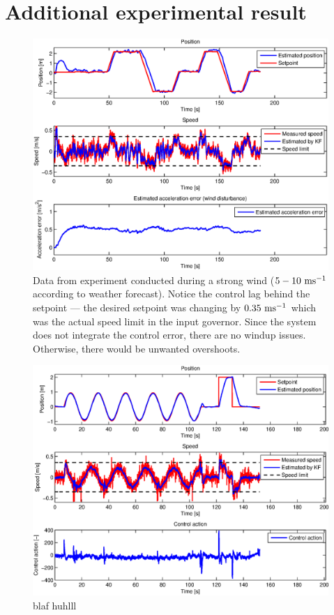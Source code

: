 \section{Additional experimental result}\label{ape:experiments}
\begin{figure}[H]
\centering
\begin{sideways}
\includegraphics[scale=0.99]{fig/experiment_vitr_venku.eps}
\end{sideways}
\caption*{Data from experiment conducted during a strong wind ($5 - 10~\mathrm{ms^{-1}}$ according to weather forecast). Notice the control lag behind the setpoint --- the desired setpoint was changing by $0.35~\mathrm{ms^{-1}}$ which was the actual speed limit in the input governor. Since the system does not integrate the control error, there are no windup issues. Otherwise, there would be unwanted overshoots.}
\end{figure}

\begin{figure}[H]
\centering
\begin{sideways}
\includegraphics[scale=0.99]{fig/trajectory_circle_apendix.eps}
\end{sideways}
\caption*{blaf huhlll}
\end{figure}
